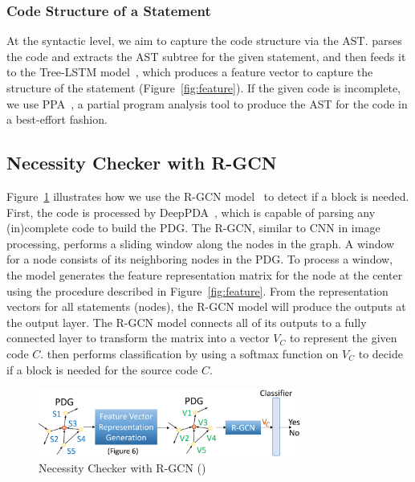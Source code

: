 \vspace{-1pt}
\subsubsection{Code Structure of a Statement}

At the syntactic level, we aim to capture the code structure via the
AST. {\tool} parses the code and extracts the AST subtree for the
given statement, and then feeds it to the Tree-LSTM
model~\cite{tai2015improved}, which produces a feature vector to
capture the structure of the statement (Figure~\ref{fig:feature}). If
the given code is incomplete, we use PPA~\cite{dagenais-oopsla08}, a
partial program analysis tool to produce the AST for the code in a
best-effort fashion.


\subsection{ Necessity Checker with R-GCN}
\label{model:sec}



Figure~\ref{fig:gcn} illustrates how we use the R-GCN model~\cite{rgcn} to
detect if a  block is needed.
First, the code is processed by DeepPDA~\cite{icse23}, which is
capable of parsing any (in)complete code to build the PDG. The
R-GCN, similar to CNN in image processing, performs a sliding
window along the nodes in the graph. A window for a node consists of
its neighboring nodes in the PDG.
To process a window, the model generates the feature representation
matrix for the node at the center using the procedure described in
Figure~\ref{fig:feature}.
From the representation vectors for all statements (nodes), the R-GCN
model will produce the outputs at the output layer. The R-GCN model
connects all of its outputs to a fully connected layer to transform
the matrix into a vector $V_C$ to represent the given code
$C$. {\tool} then performs classification by using a softmax function
on $V_C$ to decide if a  block is needed for the
source code $C$.

\begin{figure}[t]
	\centering
	\includegraphics[width=3.4in]{xblock.png}
	\caption{ Necessity Checker with R-GCN ({\xblock})}
	\label{fig:gcn}	
\end{figure}

